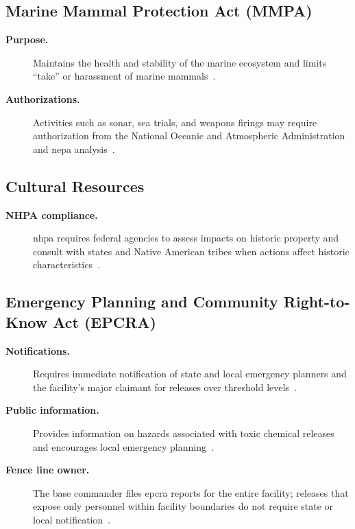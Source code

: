 \documentclass[../main.tex]{subfiles}
\begin{document}
\subsection{Marine Mammal Protection Act (MMPA)}
\begin{description}
  \item[\textbf{Purpose.}] Maintains the health and stability of the marine ecosystem and limits ``take'' or harassment of marine mammals~\autocite{edo-3-3-7-environmental-requirements-2025}.
  \item[\textbf{Authorizations.}] Activities such as sonar, sea trials, and weapons firings may require authorization from the National Oceanic and Atmospheric Administration and \ac{nepa} analysis~\autocite{edo-3-3-7-environmental-requirements-2025}.
\end{description}

\subsection{Cultural Resources}
\begin{description}
  \item[\textbf{NHPA compliance.}] \ac{nhpa} requires federal agencies to assess impacts on historic property and consult with states and Native American tribes when actions affect historic characteristics~\autocite{edo-3-3-7-environmental-requirements-2025}.
\end{description}

\subsection{Emergency Planning and Community Right-to-Know Act (EPCRA)}
\begin{description}
  \item[\textbf{Notifications.}] Requires immediate notification of state and local emergency planners and the facility's major claimant for releases over threshold levels~\autocite{edo-3-3-7-environmental-requirements-2025}.
  \item[\textbf{Public information.}] Provides information on hazards associated with toxic chemical releases and encourages local emergency planning~\autocite{edo-3-3-7-environmental-requirements-2025}.
  \item[\textbf{Fence line owner.}] The base commander files \ac{epcra} reports for the entire facility; releases that expose only personnel within facility boundaries do not require state or local notification~\autocite{edo-3-3-7-environmental-requirements-2025}.
\end{description}
\end{document}
